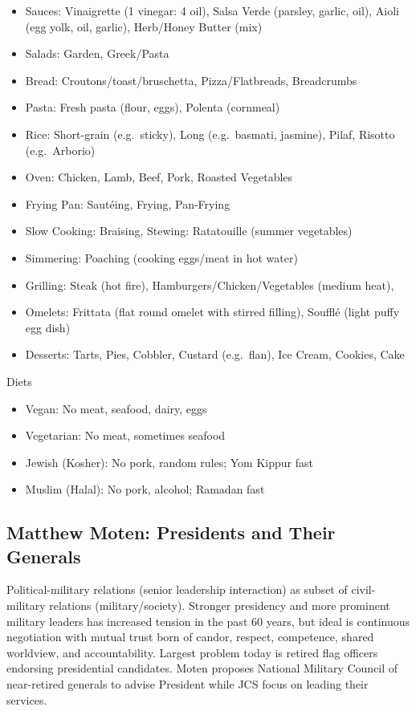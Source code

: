 \documentclass[
]{article}
\begin{document}
\begin{itemize}
\item
  Sauces: Vinaigrette (1 vinegar: 4 oil), Salsa Verde (parsley, garlic,
  oil), Aioli (egg yolk, oil, garlic), Herb/Honey Butter (mix)
\item
  Salads: Garden, Greek/Pasta
\item
  Bread: Croutons/toast/bruschetta, Pizza/Flatbreads, Breadcrumbs
\item
  Pasta: Fresh pasta (flour, eggs), Polenta (cornmeal)
\item
  Rice: Short-grain (e.g.~sticky), Long (e.g.~basmati, jasmine), Pilaf,
  Risotto (e.g.~Arborio)
\item
  Oven: Chicken, Lamb, Beef, Pork, Roasted Vegetables
\item
  Frying Pan: Sautéing, Frying, Pan-Frying
\item
  Slow Cooking: Braising, Stewing: Ratatouille (summer vegetables)
\item
  Simmering: Poaching (cooking eggs/meat in hot water)
\item
  Grilling: Steak (hot fire), Hamburgers/Chicken/Vegetables (medium
  heat),
\item
  Omelets: Frittata (flat round omelet with stirred filling), Soufflé
  (light puffy egg dish)
\item
  Desserts: Tarts, Pies, Cobbler, Custard (e.g.~flan), Ice Cream,
  Cookies, Cake
\end{itemize}

Diets

\begin{itemize}
\item
  Vegan: No meat, seafood, dairy, eggs
\item
  Vegetarian: No meat, sometimes seafood
\item
  Jewish (Kosher): No pork, random rules; Yom Kippur fast
\item
  Muslim (Halal): No pork, alcohol; Ramadan fast
\end{itemize}

\hypertarget{matthew-moten-presidents-and-their-generals}{%
\subsection{Matthew Moten: Presidents and Their
Generals}\label{matthew-moten-presidents-and-their-generals}}

Political-military relations (senior leadership interaction) as subset
of civil-military relations (military/society). Stronger presidency and
more prominent military leaders has increased tension in the past 60
years, but ideal is continuous negotiation with mutual trust born of
candor, respect, competence, shared worldview, and accountability.
Largest problem today is retired flag officers endorsing presidential
candidates. Moten proposes National Military Council of near-retired
generals to advise President while JCS focus on leading their services.
\end{document}
